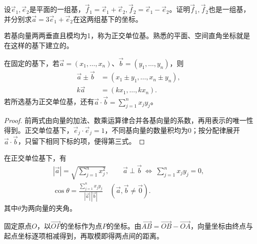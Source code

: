 \begin{example}
设\(\vec e_1,\vec e_2\)是平面的一组基，\(\vec f_1=\vec e_1+\vec e_2,\vec f_2=\vec e_1-\vec e_2\)。证明\(\vec f_1,\vec f_2\)也是一组基，并分别求\(\vec a=3\vec e_1+\vec e_2\)在这两组基下的坐标。
\end{example}

若基向量两两垂直且模均为1，称为{\heiti 正交单位基}。熟悉的平面、空间直角坐标就是在这样的基下建立的。

\begin{theorem}[坐标运算]\label{thm:vector-coordinate-laws}
在固定的基下，若\(\vec a=(x_1,\ldots,x_n)\)、\(\vec b=(y_1,\ldots,y_n)\)，则
\[
\begin{aligned}
 \vec a\pm\vec b&=(x_1\pm y_1,\ldots,x_n\pm y_n),\\
 k\vec a&=(kx_1,\ldots,kx_n).
\end{aligned}
\]
若所选基为正交单位基，还有\(\vec a\cdot\vec b=\sum_{j=1}^n x_jy_j\)。
\end{theorem}

\begin{proof}
前两式由向量的加法、数乘运算律合并各基向量的系数，再用表示的唯一性得到。正交单位基下，\(\vec e_j\cdot\vec e_j=1\)，不同基向量的数量积均为0；按分配律展开\(\vec a\cdot\vec b\)，只留下相同下标的项，便得第三式。
\end{proof}

\begin{corollary}\label{cor:vector-coordinate-metric}
在正交单位基下，有
\[
\begin{gathered}
 |\vec a|=\sqrt{\sum_{j=1}^n x_j^2},\qquad
 \vec a\perp\vec b\ \Longleftrightarrow\ \sum_{j=1}^n x_jy_j=0,\\
 \cos\theta=\frac{\sum_{j=1}^n x_jy_j}{|\vec a|\,|\vec b|}
 \quad(\vec a,\vec b\ne\vec0).
\end{gathered}
\]
其中\(\theta\)为两向量的夹角。
\end{corollary}

固定原点\(O\)，以\(\vec{OP}\)的坐标作为点\(P\)的坐标。由\(\vec{AB}=\vec{OB}-\vec{OA}\)，向量坐标由终点与起点坐标逐项相减得到，再取模即得两点间的距离。


